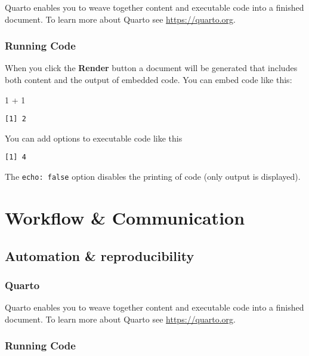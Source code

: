 \documentclass[
  letterpaper,
  DIV=11,
  numbers=noendperiod]{scrreprt}
\newenvironment{Shaded}{\begin{snugshade}}{\end{snugshade}}
\newcommand{\DecValTok}[1]{\textcolor[rgb]{0.68,0.00,0.00}{#1}}
\newcommand{\SpecialCharTok}[1]{\textcolor[rgb]{0.37,0.37,0.37}{#1}}
\begin{document}
Quarto enables you to weave together content and executable code into a
finished document. To learn more about Quarto see
\url{https://quarto.org}.

\hypertarget{running-code-8}{%
\section{Running Code}\label{running-code-8}}

When you click the \textbf{Render} button a document will be generated
that includes both content and the output of embedded code. You can
embed code like this:

\begin{Shaded}
\begin{Highlighting}[]
\DecValTok{1} \SpecialCharTok{+} \DecValTok{1}
\end{Highlighting}
\end{Shaded}

\begin{verbatim}
[1] 2
\end{verbatim}

You can add options to executable code like this

\begin{verbatim}
[1] 4
\end{verbatim}

The \texttt{echo:\ false} option disables the printing of code (only
output is displayed).

\part{Workflow \& Communication}

\hypertarget{automation-reproducibility}{%
\chapter{Automation \&
reproducibility}\label{automation-reproducibility}}

\hypertarget{quarto-9}{%
\section{Quarto}\label{quarto-9}}

Quarto enables you to weave together content and executable code into a
finished document. To learn more about Quarto see
\url{https://quarto.org}.

\hypertarget{running-code-9}{%
\section{Running Code}\label{running-code-9}}
\end{document}
